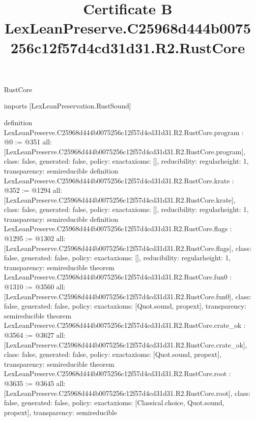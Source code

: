 \begin{lexlean}{RustCore}
\title{Certificate B LexLeanPreserve.C25968d444b0075256c12f57d4cd31d31.R2.RustCore}
\begin{coremodule}
imports [LexLeanPreservation.RustSound]

definition LexLeanPreserve.C25968d444b0075256c12f57d4cd31d31.R2.RustCore.program : @0 := @351 {
  all: [LexLeanPreserve.C25968d444b0075256c12f57d4cd31d31.R2.RustCore.program],
  class: false,
  generated: false,
  policy: exact{axioms: []},
  reducibility: regular{height: 1},
  transparency: semireducible
}
definition LexLeanPreserve.C25968d444b0075256c12f57d4cd31d31.R2.RustCore.krate : @352 := @1294 {
  all: [LexLeanPreserve.C25968d444b0075256c12f57d4cd31d31.R2.RustCore.krate],
  class: false,
  generated: false,
  policy: exact{axioms: []},
  reducibility: regular{height: 1},
  transparency: semireducible
}
definition LexLeanPreserve.C25968d444b0075256c12f57d4cd31d31.R2.RustCore.flags : @1295 := @1302 {
  all: [LexLeanPreserve.C25968d444b0075256c12f57d4cd31d31.R2.RustCore.flags],
  class: false,
  generated: false,
  policy: exact{axioms: []},
  reducibility: regular{height: 1},
  transparency: semireducible
}
theorem LexLeanPreserve.C25968d444b0075256c12f57d4cd31d31.R2.RustCore.fun0 : @1310 := @3560 {
  all: [LexLeanPreserve.C25968d444b0075256c12f57d4cd31d31.R2.RustCore.fun0],
  class: false,
  generated: false,
  policy: exact{axioms: [Quot.sound, propext]},
  transparency: semireducible
}
theorem LexLeanPreserve.C25968d444b0075256c12f57d4cd31d31.R2.RustCore.crate_ok : @3564 := @3627 {
  all: [LexLeanPreserve.C25968d444b0075256c12f57d4cd31d31.R2.RustCore.crate_ok],
  class: false,
  generated: false,
  policy: exact{axioms: [Quot.sound, propext]},
  transparency: semireducible
}
theorem LexLeanPreserve.C25968d444b0075256c12f57d4cd31d31.R2.RustCore.root : @3635 := @3645 {
  all: [LexLeanPreserve.C25968d444b0075256c12f57d4cd31d31.R2.RustCore.root],
  class: false,
  generated: false,
  policy: exact{axioms: [Classical.choice, Quot.sound, propext]},
  transparency: semireducible
}


\end{coremodule}
\end{lexlean}
